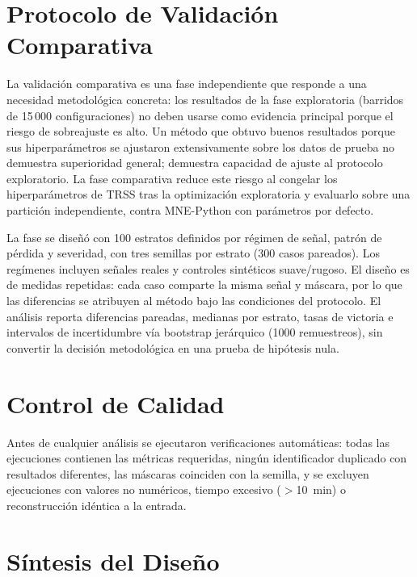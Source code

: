\section{Protocolo de Validación Comparativa}
\label{sec:confirmatory}

La validación comparativa es una fase independiente que responde a una necesidad metodológica concreta: los resultados de la fase exploratoria (barridos de 15\,000 configuraciones) no deben usarse como evidencia principal porque el riesgo de sobreajuste es alto. Un método que obtuvo buenos resultados porque sus hiperparámetros se ajustaron extensivamente sobre los datos de prueba no demuestra superioridad general; demuestra capacidad de ajuste al protocolo exploratorio. La fase comparativa reduce este riesgo al congelar los hiperparámetros de TRSS tras la optimización exploratoria y evaluarlo sobre una partición independiente, contra MNE-Python con parámetros por defecto.

La fase se diseñó con 100 estratos definidos por régimen de señal, patrón de pérdida y severidad, con tres semillas por estrato (300 casos pareados). Los regímenes incluyen señales reales y controles sintéticos suave/rugoso. El diseño es de medidas repetidas: cada caso comparte la misma señal y máscara, por lo que las diferencias se atribuyen al método bajo las condiciones del protocolo. El análisis reporta diferencias pareadas, medianas por estrato, tasas de victoria e intervalos de incertidumbre vía bootstrap jerárquico (1000 remuestreos), sin convertir la decisión metodológica en una prueba de hipótesis nula.

\section{Control de Calidad}

Antes de cualquier análisis se ejecutaron verificaciones automáticas: todas las ejecuciones contienen las métricas requeridas, ningún identificador duplicado con resultados diferentes, las máscaras coinciden con la semilla, y se excluyen ejecuciones con valores no numéricos, tiempo excesivo ($>$10~min) o reconstrucción idéntica a la entrada.

\section{Síntesis del Diseño}

